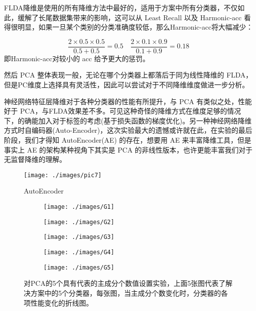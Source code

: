 \documentclass[fleqn]{Paquetes/RevDigMatEduInt}
\begin{document}
FLDA降维是使用的所有降维方法中最好的，适用于方案中所有分类器，不仅如此，缓解了长尾数据集带来的影响，这可以从 Least Recall 以及 Harmonic-acc 看得很明显，如果一旦某个类别的分类准确度较低，那么Harmonic-acc将大幅减少：
\begin{nota}
	$$
	\frac{2 \times 0.5 \times 0.5}{0.5 + 0.5} = 0.5 \quad \frac{2 \times 0.1 \times 0.9}{ 0.1 + 0.9} = 0.18
	$$
	即Harmonic-acc对较小的 acc 给予更大的惩罚。
\end{nota}
然后 PCA 整体表现一般，无论在哪个分类器上都落后于同为线性降维的 FLDA，但是PC维度上选择具有灵活性，因此可以尝试对于不同降维维度做进一步分析。

神经网络特征层降维对于各种分类器的性能有所提升，与 PCA 有类似之处，性能好于 PCA，与FLDA效果差不多。可见这种奇怪的降维方式在维度足够的情况下，的确能加入对于标签的考虑(基于损失函数的梯度优化)。另一种神经网络降维方式时自编码器(Auto-Encoder)，这次实验最大的遗憾或许就在此，在实验的最后阶段，我们才得知 AutoEncoder(AE)\cite{1} 的存在，想要用 AE 来丰富降维工具，但是事实上 AE 的架构某种视角下其实是 PCA 的非线性版本，也许更能丰富我们对于无监督降维的理解。

\begin{figure}[h]
	\centering
	\texttt{[image: ./images/pic7]}
	\caption{AutoEncoder}
\end{figure}

\begin{figure*}
	\centering
	\begin{subfigure}{0.315\textwidth}
		\texttt{[image: ./images/G1]}
		\caption{}
	\end{subfigure}
	\begin{subfigure}{0.315\textwidth}
		\texttt{[image: ./images/G2]}
		\caption{}
	\end{subfigure}
	\begin{subfigure}{0.315\textwidth}
		\texttt{[image: ./images/G3]}
		\caption{}
	\end{subfigure}
	\begin{subfigure}{0.315\textwidth}
		\texttt{[image: ./images/G4]}
		\caption{}
	\end{subfigure}
	\begin{subfigure}{0.315\textwidth}
		\texttt{[image: ./images/G5]}
		\caption{}
	\end{subfigure}
	\caption{对PCA的5个具有代表的主成分个数值设置实验，上面5张图代表了解决方案中的5个分类器，每张图，当主成分个数变化时，分类器的各项性能变化的折线图。}
\end{figure*}
\end{document}

